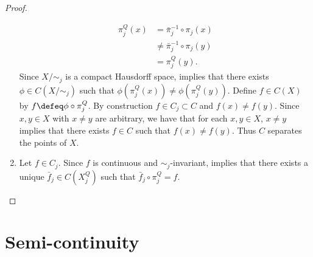 \documentclass{book}
\begin{document}
\begin{proof}
\begin{enumerate}
		\begin{align*}
			\pi^Q_j(x)
			& = \bar{\pi}_j^{-1} \circ \pi_j (x) \\
			& \neq \bar{\pi}_j^{-1} \circ \pi_j (y) \\
			& = \pi^Q_j(y).
		\end{align*}
		Since $X/{\sim_j}$ is a compact Hausdorff space,   implies that there exists $\phi \in C(X/{\sim_j})$ such that $\phi(\pi^Q_j(x)) \neq \phi(\pi^Q_j(y))$. Define $f \in C(X)$ by $f \defeq \phi \circ \pi^Q_j$. By construction $f \in C_j \subset C$ and $f(x) \neq f(y)$. Since $x,y \in X$ with $x \neq y$ are arbitrary, we have that for each $x,y \in X$, $x \neq y$ implies that there exists $f \in C$ such that $f(x) \neq f(y)$. Thus $C$ separates the points of $X$.
		\item Let $f \in C_j$. Since $f$ is continuous and ${\sim_j}$-invariant,  implies that there exists a unique $\bar{f}_j \in C(X^Q_j)$ such that $\bar{f}_j \circ \pi^Q_j = f$.   
	\end{enumerate}
\end{proof}
	
	
	
	
	
	
	
	
	
	
	
	





	
	
	
	
	
	
	
	
	
	
	
	
	
	
	
	
	
	
	\newpage
	\section{Semi-continuity}
	
\end{document}
